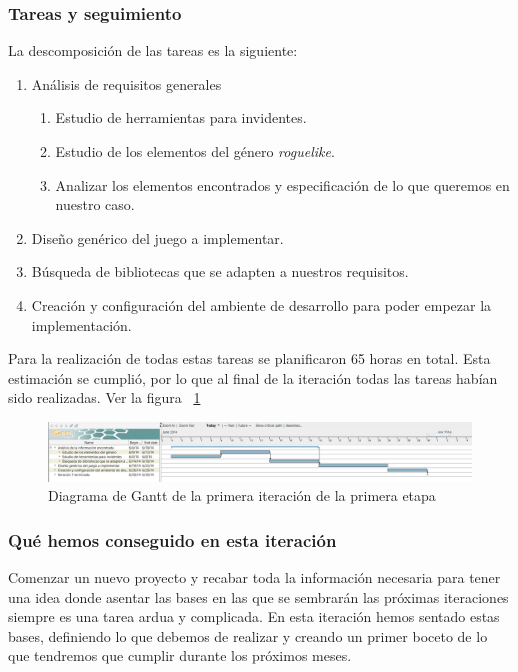 \subsubsection{Tareas y seguimiento}

La descomposición de las tareas es la siguiente:

\begin{enumerate}[label=\bfseries WBS 1.\arabic*]
  \item Análisis de requisitos generales
    \begin{enumerate}[label=\bfseries WBS 1.1.\arabic*]
      \item Estudio de herramientas para invidentes.
      \item Estudio de los elementos del género \textit{roguelike}.
      \item Analizar los elementos encontrados y especificación de lo que queremos en nuestro caso.
    \end{enumerate}
  \item Diseño genérico del juego a implementar.
  \item Búsqueda de bibliotecas que se adapten a nuestros requisitos.
  \item Creación y configuración del ambiente de desarrollo para poder empezar la implementación.
\end{enumerate}

Para la realización de todas estas tareas se planificaron 65 horas en total. Esta estimación se cumplió, por lo que al final de la iteración todas las tareas habían sido realizadas. Ver la figura ~\ref{fig:sec1it1}

\begin{figure}
    \includegraphics[width=\textwidth,height=\textheight,keepaspectratio]{./img/sec1it1.png}
  \caption{Diagrama de Gantt de la primera iteración de la primera etapa}
  \label{fig:sec1it1}
\end{figure}

\subsubsection{Qué hemos conseguido en esta iteración}

Comenzar un nuevo proyecto y recabar toda la información necesaria para tener una idea donde asentar las bases en las que se sembrarán las próximas iteraciones siempre es una tarea ardua y complicada. En esta iteración hemos sentado estas bases, definiendo lo que debemos de realizar y creando un primer boceto de lo que tendremos que cumplir durante los próximos meses.

